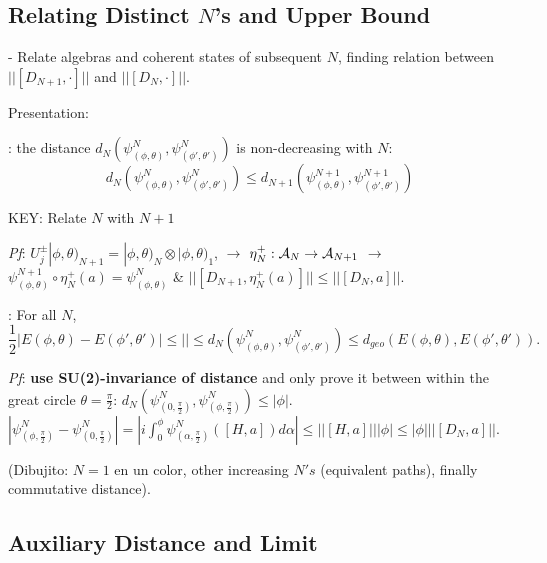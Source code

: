 \linea
\subsection{Relating Distinct $N$'s and Upper Bound}

{\color{gray} 
 - Relate algebras and coherent states of subsequent $N$, finding relation between $||[D_{N+1}, \cdot]||$ and $||[D_N, \cdot]||$.
 
Presentation:

: the distance $d_N(\psi^N_{(\phi, \theta)}, \psi^N_{(\phi', \theta')})$ is non-decreasing with $N$:
\begin{equation}
    d_N(\psi^N_{(\phi, \theta)}, \psi^N_{(\phi', \theta')}) \leq d_{N+1}(\psi^{N+1}_{(\phi, \theta)}, \psi^{N+1}_{(\phi', \theta')})
\end{equation}

 KEY: Relate $N$ with $N+1$
 
\textit{Pf}: $U^\pm_j |\phi, \theta)_{N+1} = |\phi, \theta)_N \otimes |\phi, \theta)_1$, $\xrightarrow{}$ $\eta^+_N: \mathcal A_N \to \mathcal A_{N + 1}$ $\longrightarrow{}$ $\psi^{N+1}_{(\phi, \theta)} \circ \eta^+_N(a) = \psi^N_{(\phi, \theta)}$ \& $||[D_{N + 1}, \eta^+_N(a)]|| \leq ||[D_N, a]||$.

: For all $N$, 
\begin{equation}
    \frac{1}{2}|E(\phi, \theta)- E(\phi', \theta')| \leq || \leq d_N(\psi^N_{(\phi, \theta)}, \psi^N_{(\phi', \theta')}) \leq d_{geo}(E(\phi, \theta), E(\phi', \theta')).
\end{equation}

\textit{Pf}: \textbf{use SU(2)-invariance of distance} and only prove it between within the great circle $\theta = \frac{\pi}{2}$: $d_N(\psi^N_{(0, \frac{\pi}{2})}, \psi^N_{(\phi, \frac{\pi}{2})}) \leq |\phi|$. 
$|\psi^N_{(\phi, \frac{\pi}{2})} - \psi^N_{(0, \frac{\pi}{2})}| = |i \int_0^\phi \psi^N_{(\alpha, \frac{\pi}{2})}([H, a]) d\alpha | \leq ||[H, a]|| |\phi| \leq |\phi| ||[D_N, a]||$.

(Dibujito: $N=1$ en un color, other increasing $N's$ (equivalent paths), finally commutative distance).
}

\linea

\subsection{Auxiliary Distance and Limit}

